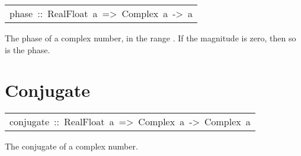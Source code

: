 \begin{haddockdesc}
\item[\begin{tabular}{@{}l}
phase\ ::\ RealFloat\ a\ =>\ Complex\ a\ ->\ a
\end{tabular}]\haddockbegindoc
The phase of a complex number, in the range .
 If the magnitude is zero, then so is the phase.
\par

\end{haddockdesc}
\section{Conjugate
}
\begin{haddockdesc}
\item[\begin{tabular}{@{}l}
conjugate\ ::\ RealFloat\ a\ =>\ Complex\ a\ ->\ Complex\ a
\end{tabular}]\haddockbegindoc
The conjugate of a complex number.
\par

\end{haddockdesc}
